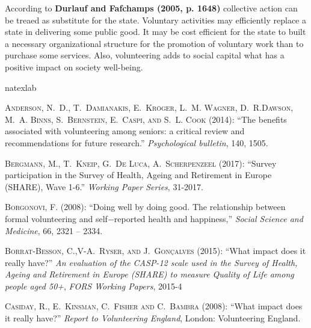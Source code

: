 \documentclass[10pt, letterpaper]{article}
\begin{document}
\begin{spacing}{1.4}
According to \textbf{Durlauf and Fafchamps (2005, p. 1648)} collective action can be treaed as substitute for the state. Voluntary activities may efficiently replace a state in delivering some public good. It may be cost efficient for the state to built a necessary organizational structure for the promotion of voluntary work than to purchase some services. Also, volunteering adds to social capital what has a positive impact on society well-being.  


\begin{thebibliography}{87}
\newcommand{\enquote}[1]{``#1''}
\expandafter\ifx\csname natexlab\endcsname\relax\def\natexlab#1{#1}\fi

\textsc{Anderson, N.~D., T.~Damianakis, E.~Kr{\"o}ger, L.~M. Wagner, D.~R.Dawson, M.~A. Binns, S.~Bernstein, E.~Caspi, and S.~L. Cook} (2014):  \enquote{The benefits associated with volunteering among seniors: a critical  review and recommendations for future research.} \emph{Psychological bulletin}, 140, 1505.

\textsc{Bergmann, M., T.~Kneip, G.~De Luca, A.~Scherpenzeel} (2017):  \enquote{Survey participation in the Survey of Health, Ageing and Retirement in Europe (SHARE), Wave 1-6.} \emph{Working Paper Series}, 31-2017.


\textsc{Borgonovi, F.} (2008): \enquote{Doing well by doing good. The relationship between formal volunteering and self$-$reported health and happiness,} \emph{Social Science and Medicine}, 66,  2321 -- 2334.

\textsc{Borrat-Besson, C.,V-A.~Ryser, and J.~Gonçalves} (2015):  \enquote{What impact does it really have?} \emph{An evaluation of the CASP-12 scale used in the Survey of Health, Ageing and Retirement in Europe (SHARE) to measure Quality of Life among people aged 50+}, \emph{FORS Working Papers}, 2015-4


\textsc{Casiday, R., E.~Kinsman, C.~Fisher and C.~Bambra} (2008):  \enquote{What impact does it really have?} \emph{Report to Volunteering England}, London: Volunteering England.


\end{thebibliography}
\end{spacing}
\end{document}
